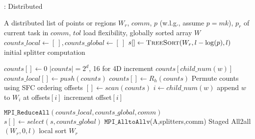 \begin{algorithm}[t]
  \caption{\dsort: Distributed \tsort}\label{alg:dsort}
  \footnotesize
  \begin{algorithmic}[1]
    \Require A distributed list of points or regions $W_r$, $\mathit{comm}$, $p$ (w.l.g., assume $p= mk$),
    $p_r$ of current task in $\mathit{comm}$, $tol$ load flexibility, 
    \Ensure globally sorted array $W$
    \State $counts\_local \leftarrow [\ ], counts\_global \leftarrow [\ ]$    
    \State $s [] \leftarrow \textsc{TreeSort}(W_r,l-\log(p),l)$ \Comment initial splitter computation
    
    \State $counts[] \leftarrow 0$ \Comment $|counts| = 2^{d}$, 16 for 4D
    \State increment $counts[child\_num(w)]$
    \EndFor
    \State $counts\_local [] \leftarrow push(counts)$  
    \State $counts [] \leftarrow R_h(counts)$ 
    \Comment Permute counts using SFC ordering
    \State offsets $[] \leftarrow scan(counts)$
    \State $i\leftarrow child\_num(w)$
    \State append $w$ to $W_i$ at offsets$[i]$
    \State increment offset$[i]$
    \EndFor

    \State $\mathtt{MPI\_ReduceAll}(counts\_local,counts\_global,comm)$
    \State $s[] \leftarrow select(s,counts\_global)$
    \EndWhile
    \State $\mathtt{MPI\_AlltoAllv}$(A,splitters,comm)
    \Comment Staged All2all
    \State \tsort$(W_r, 0, l)$ \Comment local sort
    \State \Return $W_r$
  \end{algorithmic}
\end{algorithm}


